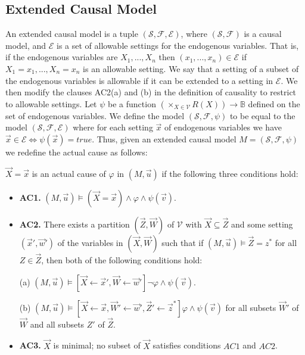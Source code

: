 \documentclass{article}
\begin{document}
\subsection{Extended Causal Model}
An extended causal model is a tuple $(\mathcal{S},\mathcal{F},
    \mathcal{E})$, where $(\mathcal{S},\mathcal{F})$ is a causal model, and $\mathcal{E}$ is a set of allowable settings for the endogenous variables.
That is, if the endogenous variables are $X_1,...,X_n$ then
$(x_1,...,x_n) \in \mathcal{E}$ if $X_1 = x_1, ..., X_n=x_n$ is an
allowable setting.
We say that a setting of a subset of the endogenous variables is allowable if it can be extended to a setting in $\mathcal{E}$.
We then modify the clauses AC2(a) and (b) in the definition of causality to restrict to allowable settings.
Let $\psi$ be a function $(\times_{X \in \mathcal{V}}R(X))\rightarrow \mathbb{B}$ defined on the set of endogenous variables.
We define the model $(\mathcal{S},\mathcal{F},\psi)$ to be equal
to the model $(\mathcal{S},\mathcal{F},\mathcal{E})$ where
for each setting $\vec x$ of endogenous variables we have $\vec x \in \mathcal{E} \iff \psi(\vec x) = true$.
Thus, given an extended causal model $M = (\mathcal{S},\mathcal{F},\psi)$ we redefine the actual cause as follows:

\begin{definition}
    $\vec X = \vec x$ is an actual cause of $\varphi$ in $(M,\vec u)$ if the following three conditions hold:
    \begin{itemize}
        \item  \textbf{AC1.} $(M,\vec u)\models (\vec X = \vec x) \wedge \varphi \wedge \psi(\vec v)$.
        \item  \textbf{AC2. }There exists a partition $(\vec Z, \vec W)$ of $\mathcal{V}$ with $\vec X \subseteq \vec Z$ and some setting $(\vec x',\vec w')$ of the variables in $(\vec X,\vec W)$ such that if $(M,\vec u)\models \vec Z = z^*$ for all $Z\in \vec Z$, then both of the following conditions hold:

              (a) $(M,\vec u)\models[\vec X \leftarrow \vec x', \vec W \leftarrow \vec w']\neg \varphi \wedge \psi(\vec v)$.

              (b) $(M,\vec u)\models[\vec X\leftarrow \vec x, \vec W' \leftarrow \vec w', \vec Z'\leftarrow \vec z^*]\varphi \wedge \psi(\vec v)$ for all subsets $\vec W'$ of $\vec W$ and all subsets $Z'$ of $\vec Z$.

        \item  \textbf{AC3.} $\vec X$ is minimal; no subset of $\vec X$ satisfies conditions $AC1$ and $AC2$.
    \end{itemize}
\end{definition}
\end{document}
